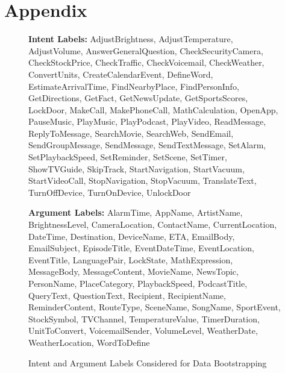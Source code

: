 \appendix
\section{Appendix}
\label{sec:appendix}
\begin{figure*}[t]
\centering
\begin{tcolorbox}[colback=gray!10, colframe=gray!30, coltitle=black,
    fonttitle=\bfseries, 
    title=Intent and Argument Labels]
\textbf{Intent Labels:}  
    AdjustBrightness, AdjustTemperature, AdjustVolume, AnswerGeneralQuestion, CheckSecurityCamera, CheckStockPrice, CheckTraffic, CheckVoicemail, CheckWeather, ConvertUnits, CreateCalendarEvent, DefineWord, EstimateArrivalTime, FindNearbyPlace, FindPersonInfo, GetDirections, GetFact, GetNewsUpdate, GetSportsScores, LockDoor, MakeCall, MakePhoneCall, MathCalculation, OpenApp, PauseMusic, PlayMusic, PlayPodcast, PlayVideo, ReadMessage, ReplyToMessage, SearchMovie, SearchWeb, SendEmail, SendGroupMessage, SendMessage, SendTextMessage, SetAlarm, SetPlaybackSpeed, SetReminder, SetScene, SetTimer, ShowTVGuide, SkipTrack, StartNavigation, StartVacuum, StartVideoCall, StopNavigation, StopVacuum, TranslateText, TurnOffDevice, TurnOnDevice, UnlockDoor 
    
    \vspace{5pt}
    
    \textbf{Argument Labels:}  
    AlarmTime, AppName, ArtistName, BrightnessLevel, CameraLocation, ContactName, CurrentLocation, DateTime, Destination, DeviceName, ETA, EmailBody, EmailSubject, EpisodeTitle, EventDateTime, EventLocation, EventTitle, LanguagePair, LockState, MathExpression, MessageBody, MessageContent, MovieName, NewsTopic, PersonName, PlaceCategory, PlaybackSpeed, PodcastTitle, QueryText, QuestionText, Recipient, RecipientName, ReminderContent, RouteType, SceneName, SongName, SportEvent, StockSymbol, TVChannel, TemperatureValue, TimerDuration, UnitToConvert, VoicemailSender, VolumeLevel, WeatherDate, WeatherLocation, WordToDefine 
    \end{tcolorbox}
    \caption{Intent and Argument Labels Considered for Data Bootstrapping}
    \label{fig:intent_argument_box}
\end{figure*}

